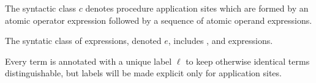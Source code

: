 \documentclass{sigplanconf}
\begin{document}
The syntactic class $c$ denotes procedure application sites which are formed by an atomic operator expression followed by a sequence of atomic operand expressions.

The syntatic class of expressions, denoted $e$, includes , and  expressions.

Every term is annotated with a unique label $\ell$ to keep otherwise identical terms distinguishable, but labels will be made explicit only for application sites.



\newcommand{\vx}[0]{\mathbf{x}}

\newcommand{\appe}[2]{(#1\,#2)^\ell}
\newcommand{\lame}[2]{(\lambda\,(#1)\,#2)}
\newcommand{\chae}[2]{(\mathit{chaperone\mhyphen operator}\,#1\,#2)^\ell}
\newcommand{\impe}[2]{(\mathit{impersonate\mhyphen operator}\,#1\,#2)}
\newcommand{\lete}[3]{(\mathbf{let}\,((#1)\,#2)\,#3)}
\newcommand{\ife}[3]{(\mathbf{if}\,#1\,#2\,#3)}

\newcommand{\ande}[2]{(\mathrm{and}\,#1\,#2)}
\newcommand{\ore}[2]{(\mathrm{or}\,#1\,#2)}
\end{document}
